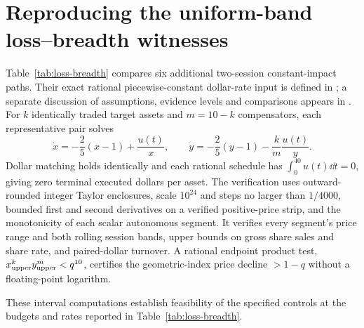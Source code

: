 \documentclass[review,hidelinks,onefignum,onetabnum]{siamonline250211}
\begin{document}
\section{Reproducing the uniform-band loss--breadth witnesses}
\label{app:loss-breadth}
Table~\ref{tab:loss-breadth} compares six additional
two-session constant-impact paths. Their exact rational
piecewise-constant dollar-rate input is defined in
; a separate
discussion of assumptions, evidence levels and comparisons
appears in .
For $k$ identically traded target assets and $m=10-k$
compensators, each representative pair solves
\[
\dot x=-\frac25(x-1)+\frac{u(t)}x,\qquad
\dot y=-\frac25(y-1)-\frac{k}{m}\frac{u(t)}y.
\]
Dollar matching holds identically and each rational schedule
has $\int_0^{40}u(t)\dd t=0$, giving zero terminal executed
dollars per asset. The verification uses outward-rounded
integer Taylor enclosures, scale $10^{24}$ and steps no
larger than $1/4000$, bounded first and second derivatives
on a verified positive-price strip, and the monotonicity
of each scalar autonomous segment. It verifies every
segment's price range and both rolling session bands,
upper bounds on gross share sales and share rate, and
paired-dollar turnover. A rational endpoint product
test, $x_{\rm upper}^{k}y_{\rm upper}^{m}<q^{10}$,
certifies the geometric-index price decline $>1-q$
without a floating-point logarithm.

These interval computations establish feasibility of the
specified controls at the budgets and rates reported
in Table~\ref{tab:loss-breadth}.
\end{document}
